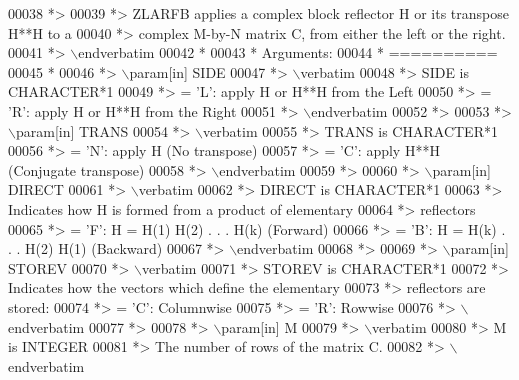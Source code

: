 \begin{DoxyCode}
00038 \textcolor{comment}{*>}
00039 \textcolor{comment}{*> ZLARFB applies a complex block reflector H or its transpose H**H to a}
00040 \textcolor{comment}{*> complex M-by-N matrix C, from either the left or the right.}
00041 \textcolor{comment}{*> \(\backslash\)endverbatim}
00042 \textcolor{comment}{*}
00043 \textcolor{comment}{*  Arguments:}
00044 \textcolor{comment}{*  ==========}
00045 \textcolor{comment}{*}
00046 \textcolor{comment}{*> \(\backslash\)param[in] SIDE}
00047 \textcolor{comment}{*> \(\backslash\)verbatim}
00048 \textcolor{comment}{*>          SIDE is CHARACTER*1}
00049 \textcolor{comment}{*>          = 'L': apply H or H**H from the Left}
00050 \textcolor{comment}{*>          = 'R': apply H or H**H from the Right}
00051 \textcolor{comment}{*> \(\backslash\)endverbatim}
00052 \textcolor{comment}{*>}
00053 \textcolor{comment}{*> \(\backslash\)param[in] TRANS}
00054 \textcolor{comment}{*> \(\backslash\)verbatim}
00055 \textcolor{comment}{*>          TRANS is CHARACTER*1}
00056 \textcolor{comment}{*>          = 'N': apply H (No transpose)}
00057 \textcolor{comment}{*>          = 'C': apply H**H (Conjugate transpose)}
00058 \textcolor{comment}{*> \(\backslash\)endverbatim}
00059 \textcolor{comment}{*>}
00060 \textcolor{comment}{*> \(\backslash\)param[in] DIRECT}
00061 \textcolor{comment}{*> \(\backslash\)verbatim}
00062 \textcolor{comment}{*>          DIRECT is CHARACTER*1}
00063 \textcolor{comment}{*>          Indicates how H is formed from a product of elementary}
00064 \textcolor{comment}{*>          reflectors}
00065 \textcolor{comment}{*>          = 'F': H = H(1) H(2) . . . H(k) (Forward)}
00066 \textcolor{comment}{*>          = 'B': H = H(k) . . . H(2) H(1) (Backward)}
00067 \textcolor{comment}{*> \(\backslash\)endverbatim}
00068 \textcolor{comment}{*>}
00069 \textcolor{comment}{*> \(\backslash\)param[in] STOREV}
00070 \textcolor{comment}{*> \(\backslash\)verbatim}
00071 \textcolor{comment}{*>          STOREV is CHARACTER*1}
00072 \textcolor{comment}{*>          Indicates how the vectors which define the elementary}
00073 \textcolor{comment}{*>          reflectors are stored:}
00074 \textcolor{comment}{*>          = 'C': Columnwise}
00075 \textcolor{comment}{*>          = 'R': Rowwise}
00076 \textcolor{comment}{*> \(\backslash\)endverbatim}
00077 \textcolor{comment}{*>}
00078 \textcolor{comment}{*> \(\backslash\)param[in] M}
00079 \textcolor{comment}{*> \(\backslash\)verbatim}
00080 \textcolor{comment}{*>          M is INTEGER}
00081 \textcolor{comment}{*>          The number of rows of the matrix C.}
00082 \textcolor{comment}{*> \(\backslash\)endverbatim}

\end{DoxyCode}

